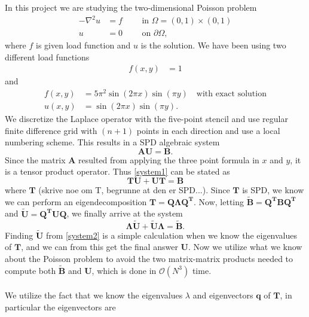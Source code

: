 In this project we are studying the two-dimensional Poisson problem
\begin{align}
-\nabla^2u&=f \quad\quad\text{ in } \Omega=(0,1)\times(0,1)\\
u&=0 \quad\quad\text{ on } \partial \Omega, \nonumber
\label{Poisson}
\end{align}
where $f$ is given load function and $u$ is the solution. We have been using two different load functions
\begin{align*}
f(x,y)&=1
\end{align*}
and
\begin{align}
f(x,y)&=5\pi^2\sin(2\pi x)\sin(\pi y) \quad\text{with exact solution} \\
u(x,y)&=\sin(2\pi x)\sin(\pi y).\nonumber
\label{loadfunc2}
\end{align}
We discretize the Laplace operator with the five-point stencil and use regular finite difference grid with $(n+1)$ points in each direction and use a local numbering scheme. This results in a SPD algebraic system
\begin{equation}
	\mathbf{AU} = \mathbf{B}.
	\label{system1}
\end{equation}
Since the matrix $\mathbf{A}$ resulted from applying the three point formula in $x$ and $y$, it is a tensor product operator. Thus \eqref{system1} can be stated as 
\begin{equation}
	\mathbf{TU} + \mathbf{UT} = \mathbf{B}
\end{equation}
where $\mathbf{T}$ (skrive noe om T, begrunne at den er SPD...). Since $\mathbf{T}$ is SPD, we know we can perform an eigendecomposition $\mathbf{T} = \mathbf{Q\Lambda Q^T}$. Now, letting $\mathbf{\widetilde{B}} = \mathbf{Q^TBQ^T}$ and $\mathbf{\widetilde{U}} = \mathbf{Q^TUQ}$, we finally arrive at the system 
\begin{equation}
	\mathbf{\Lambda\widetilde{U}} + \mathbf{\widetilde{U}\Lambda} = \mathbf{\widetilde{B}}.
	\label{system2}
\end{equation}
Finding $\mathbf{\widetilde{U}}$ from \eqref{system2} is a simple calculation when we know the eigenvalues of $\mathbf{T}$, and we can from this get the final answer $\mathbf{U}$. Now we utilize what we know about the Poisson problem to avoid the two matrix-matrix products needed to compute both $\mathbf{\widetilde{B}}$ and $\mathbf{U}$, which is done in $\mathcal{O}(N^3)$ time. \\
\\
We utilize the fact that we know the eigenvalues $\lambda$ and eigenvectors $\mathbf{q}$ of $\mathbf{T}$, in particular the eigenvectors are 
